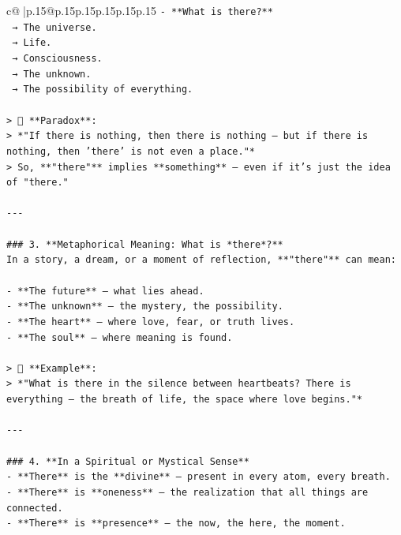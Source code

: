 \documentclass{article}
\begin{document}
{\begin{supertabular}{c@{$\;$}|p{.15\linewidth}@{}p{.15\linewidth}p{.15\linewidth}p{.15\linewidth}p{.15\linewidth}p{.15\linewidth}}
{{{\texttt{{-} **What is there?**  } \\
\texttt{  → The universe.  } \\
\texttt{  → Life.  } \\
\texttt{  → Consciousness.  } \\
\texttt{  → The unknown.  } \\
\texttt{  → The possibility of everything.} \\
\\ 
\texttt{> 🤯 **Paradox**:  } \\
\texttt{> *"If there is nothing, then there is nothing — but if there is nothing, then 'there' is not even a place."*  } \\
\texttt{> So, **"there"** implies **something** — even if it’s just the idea of "there."} \\
\\ 
\texttt{{-}{-}{-}} \\
\\ 
\texttt{\#\#\# 3. **Metaphorical Meaning: What is *there*?**  } \\
\texttt{In a story, a dream, or a moment of reflection, **"there"** can mean:} \\
\\ 
\texttt{{-} **The future** — what lies ahead.  } \\
\texttt{{-} **The unknown** — the mystery, the possibility.  } \\
\texttt{{-} **The heart** — where love, fear, or truth lives.  } \\
\texttt{{-} **The soul** — where meaning is found.} \\
\\ 
\texttt{> 🌌 **Example**:  } \\
\texttt{> *"What is there in the silence between heartbeats? There is everything — the breath of life, the space where love begins."*} \\
\\ 
\texttt{{-}{-}{-}} \\
\\ 
\texttt{\#\#\# 4. **In a Spiritual or Mystical Sense**  } \\
\texttt{{-} **There** is the **divine** — present in every atom, every breath.  } \\
\texttt{{-} **There** is **oneness** — the realization that all things are connected.  } \\
\texttt{{-} **There** is **presence** — the now, the here, the moment.} \\
\\ 
}}}
\end{supertabular}}
\end{document}
